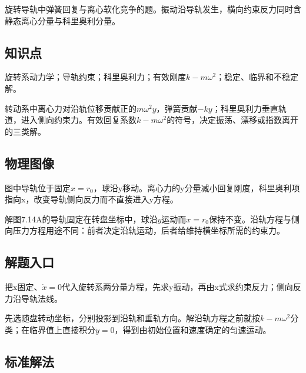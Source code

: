 \documentclass[UTF8,fontset=fandol,a4paper,11pt]{ctexart}
\begin{document}
旋转导轨中弹簧回复与离心软化竞争的题。振动沿导轨发生，横向约束反力同时含静态离心分量与科里奥利分量。



\subsection*{知识点}

旋转系动力学；导轨约束；科里奥利力；有效刚度\(k-m\omega ^{2}\)；稳定、临界和不稳定解。

转动系中离心力对沿轨位移贡献正的$m\omega^2y$，弹簧贡献$-ky$；科里奥利力垂直轨道，进入侧向约束力。有效回复系数$k-m\omega^2$的符号，决定振荡、漂移或指数离开的三类解。




\subsection*{物理图像}

图中导轨位于固定\(x=r_{0}\)，球沿y移动。离心力的y分量减小回复刚度，科里奥利项指向x，改变导轨侧向反力而不直接进入y方程。

解图7.14A的导轨固定在转盘坐标中，球沿$y$运动而$x=r_0$保持不变。沿轨方程与侧向压力方程用途不同：前者决定沿轨运动，后者给维持横坐标所需的约束力。




\subsection*{解题入口}

把x固定、\(\dot x=0\)代入旋转系两分量方程，先求y振动，再由x式求约束反力；侧向反力沿导轨法线。

先选随盘转动坐标，分别投影到沿轨和垂轨方向。解沿轨方程之前就按$k-m\omega^2$分类；在临界值上直接积分$\ddot y=0$，得到由初始位置和速度确定的匀速运动。





\subsection*{标准解法}
\end{document}
